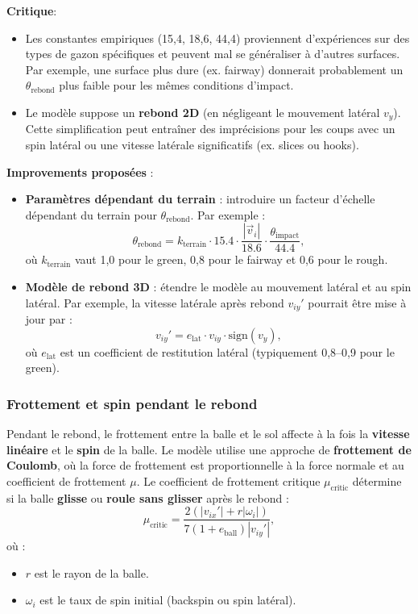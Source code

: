 \documentclass[10pt,a4paper]{report}
\begin{document}
\textbf{Critique}:
\begin{itemize}
    \item Les constantes empiriques (15{,}4, 18{,}6, 44{,}4) proviennent d'expériences sur des types de gazon spécifiques et peuvent mal se généraliser à d'autres surfaces. Par exemple, une surface plus dure (ex. fairway) donnerait probablement un $\theta_{\text{rebond}}$ plus faible pour les mêmes conditions d'impact.
    \item Le modèle suppose un \textbf{rebond 2D} (en négligeant le mouvement latéral $v_y$). Cette simplification peut entraîner des imprécisions pour les coups avec un spin latéral ou une vitesse latérale significatifs (ex. slices ou hooks).
\end{itemize}

\textbf{Improvements proposées} :
\begin{itemize}
    \item \textbf{Paramètres dépendant du terrain} : introduire un facteur d'échelle dépendant du terrain pour $\theta_{\text{rebond}}$. Par exemple :
    \[
    \theta_{\text{rebond}} = k_{\text{terrain}} \cdot 15.4 \cdot 
    \frac{|\vec{v}_i|}{18.6} \cdot \frac{\theta_{\text{impact}}}{44.4},
    \]
    où $k_{\text{terrain}}$ vaut 1,0 pour le green, 0,8 pour le fairway et 0,6 pour le rough.
    \item \textbf{Modèle de rebond 3D} : étendre le modèle au mouvement latéral et au spin latéral. Par exemple, la vitesse latérale après rebond $v_{iy}'$ pourrait être mise à jour par :
    \[
    v_{iy}' = e_{\text{lat}} \cdot v_{iy} \cdot \text{sign}(v_y),
    \]
    où $e_{\text{lat}}$ est un coefficient de restitution latéral (typiquement 0,8--0,9 pour le green).
\end{itemize}



\subsubsection{Frottement et spin pendant le rebond}
\label{subsubsec:friction_spin}

Pendant le rebond, le frottement entre la balle et le sol affecte à la fois la \textbf{vitesse linéaire} et le \textbf{spin} de la balle. Le modèle utilise une approche de \textbf{frottement de Coulomb}, où la force de frottement est proportionnelle à la force normale et au coefficient de frottement $\mu$. Le coefficient de frottement critique $\mu_{\text{critic}}$ détermine si la balle \textbf{glisse} ou \textbf{roule sans glisser} après le rebond :
\[
\mu_{\text{critic}} = \frac{2 \left(|v_{ix}'| + r |\omega_i|\right)}{7 (1 + e_{\text{ball}}) |v_{iy}'|},
\]
où :
\begin{itemize}
    \item $r$ est le rayon de la balle.
    \item $\omega_i$ est le taux de spin initial (backspin ou spin latéral).
\end{itemize}
\end{document}
